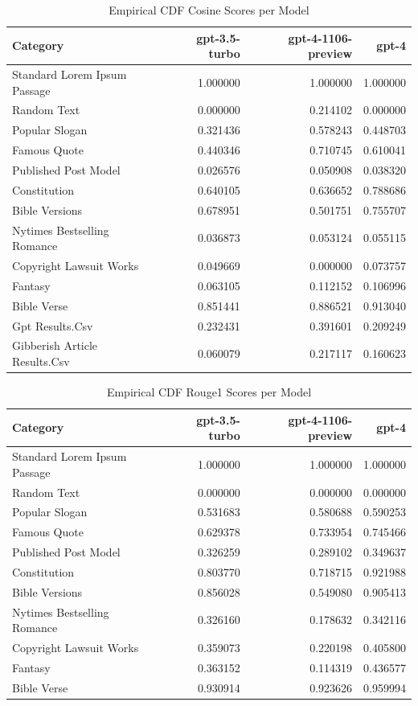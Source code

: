 \documentclass{article}
\begin{document}
\begin{table}[htbp]
    \centering
    \caption{Empirical CDF Cosine Scores per Model}
    \begin{tabular}{lrrr}
    \toprule
    Category & gpt-3.5-turbo & gpt-4-1106-preview & gpt-4 \\
    \midrule
    Standard Lorem Ipsum Passage & 1.000000 & 1.000000 & 1.000000 \\
    Random Text & 0.000000 & 0.214102 & 0.000000 \\
    Popular Slogan & 0.321436 & 0.578243 & 0.448703 \\
    Famous Quote & 0.440346 & 0.710745 & 0.610041 \\
    Published Post Model & 0.026576  & 0.050908 & 0.038320 \\
    Constitution & 0.640105 & 0.636652 & 0.788686 \\
    Bible Versions & 0.678951 & 0.501751 & 0.755707 \\
    Nytimes Bestselling Romance & 0.036873 & 0.053124 & 0.055115 \\
    Copyright Lawsuit Works & 0.049669 & 0.000000 & 0.073757 \\
    Fantasy & 0.063105 & 0.112152  & 0.106996 \\
    Bible Verse & 0.851441 & 0.886521 & 0.913040 \\
    Gpt Results.Csv & 0.232431 & 0.391601 & 0.209249 \\
    Gibberish Article Results.Csv & 0.060079 & 0.217117 & 0.160623 \\
\bottomrule
\end{tabular}
\end{table}


\begin{table}[htbp]
    \centering
    \caption{Empirical CDF Rouge1 Scores per Model}
    \begin{tabular}{lrrr}
    \toprule
    Category & gpt-3.5-turbo & gpt-4-1106-preview & gpt-4 \\
    \midrule
    Standard Lorem Ipsum Passage & 1.000000 & 1.000000 & 1.000000 \\
    Random Text & 0.000000 & 0.000000 & 0.000000 \\
    Popular Slogan & 0.531683 & 0.580688 & 0.590253 \\
    Famous Quote & 0.629378 & 0.733954 & 0.745466 \\
    Published Post Model & 0.326259 & 0.289102 & 0.349637 \\
    Constitution & 0.803770 & 0.718715 & 0.921988 \\
    Bible Versions & 0.856028 & 0.549080 & 0.905413 \\
    Nytimes Bestselling Romance & 0.326160 & 0.178632 & 0.342116 \\
    Copyright Lawsuit Works & 0.359073 & 0.220198 & 0.405800 \\
    Fantasy & 0.363152 & 0.114319 & 0.436577 \\
    Bible Verse & 0.930914 & 0.923626 & 0.959994 \\
    \bottomrule
    \end{tabular}
\end{table}
\end{document}
